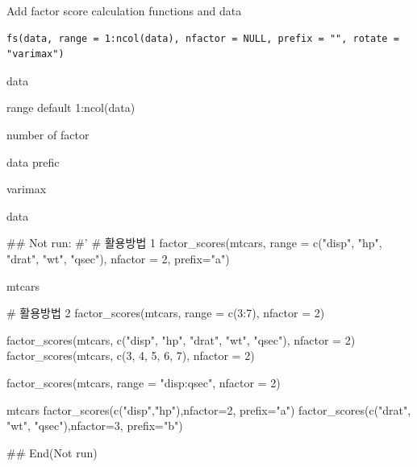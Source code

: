 \documentclass[a4paper]{book}
\begin{document}
%
\begin{Description}
Add factor score calculation functions and data
\end{Description}
%
\begin{Usage}
\begin{verbatim}
fs(data, range = 1:ncol(data), nfactor = NULL, prefix = "", rotate = "varimax")
\end{verbatim}
\end{Usage}
%
\begin{Arguments}
\begin{ldescription}
\item[\code{data}] data

\item[\code{range}] range default 1:ncol(data)

\item[\code{nfactor}] number of factor

\item[\code{prefix}] data prefic

\item[\code{rotate}] varimax
\end{ldescription}
\end{Arguments}
%
\begin{Value}
data
\end{Value}
%
\begin{Examples}
\begin{ExampleCode}


\#\# Not run: 
#'
# 활용방법 1
factor_scores(mtcars,
              range = c("disp", "hp", "drat", "wt", "qsec"),
              nfactor = 2, prefix="a")

mtcars %

# 활용방법 2
factor_scores(mtcars, range = c(3:7), nfactor = 2)

factor_scores(mtcars, c("disp", "hp", "drat", "wt", "qsec"), nfactor = 2)
factor_scores(mtcars, c(3, 4, 5, 6, 7), nfactor = 2)

factor_scores(mtcars, range = "disp:qsec", nfactor = 2)


mtcars %
  factor_scores(c("disp","hp"),nfactor=2, prefix="a") %
  factor_scores(c("drat", "wt", "qsec"),nfactor=3, prefix="b") %


## End(Not run)
\end{ExampleCode}
\end{Examples}
\end{document}
